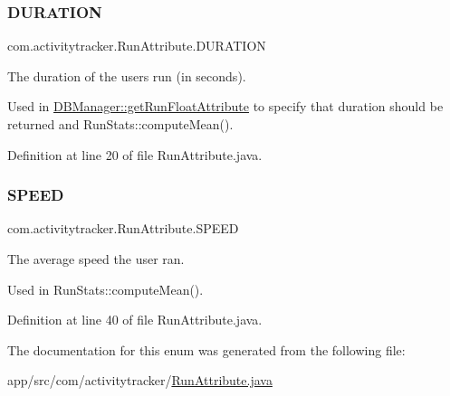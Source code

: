 \subsubsection{\texorpdfstring{D\+U\+R\+A\+T\+I\+ON}{DURATION}}
{\footnotesize\ttfamily com.\+activitytracker.\+Run\+Attribute.\+D\+U\+R\+A\+T\+I\+ON}

The duration of the user\textquotesingle{}s run (in seconds).

Used in \mbox{\hyperlink{classcom_1_1activitytracker_1_1_d_b_manager_a666452f1e5862f90c06b0beb9a9fcfdd}{D\+B\+Manager\+::get\+Run\+Float\+Attribute}} to specify that duration should be returned and Run\+Stats\+::compute\+Mean(). 

Definition at line 20 of file Run\+Attribute.\+java.

\mbox{\label{enumcom_1_1activitytracker_1_1_run_attribute_a43fc543df9ec6dfaac73a5030abfafc4}} 
\subsubsection{\texorpdfstring{S\+P\+E\+ED}{SPEED}}
{\footnotesize\ttfamily com.\+activitytracker.\+Run\+Attribute.\+S\+P\+E\+ED}

The average speed the user ran.

Used in Run\+Stats\+::compute\+Mean(). 

Definition at line 40 of file Run\+Attribute.\+java.



The documentation for this enum was generated from the following file\+:\begin{DoxyCompactItemize}
\item 
app/src/com/activitytracker/\mbox{\hyperlink{_run_attribute_8java}{Run\+Attribute.\+java}}\end{DoxyCompactItemize}
